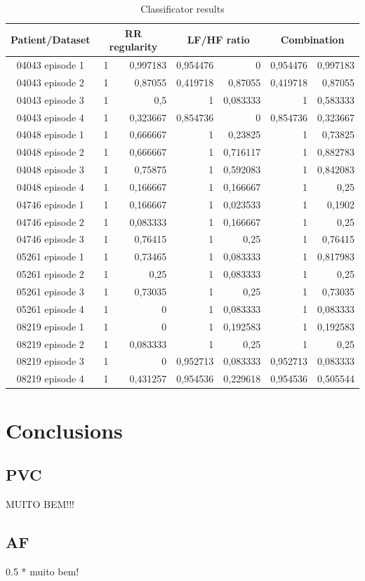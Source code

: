 \documentclass[a4paper,titlepage]{article}
\begin{document}
\begin{table}[htbp]
  \centering
  \caption{Classificator results}
    \begin{tabular}{c |rr|rr|rr|}
    \multicolumn{1}{c|}{Patient/Dataset} & \multicolumn{2}{c|}{RR regularity} & \multicolumn{2}{c|}{LF/HF ratio} & \multicolumn{2}{c|}{Combination} \\ \hline
    04043 episode 1 & 1     & 0,997183 & 0,954476 & 0     & 0,954476 & 0,997183 \\
    04043 episode 2 & 1     & 0,87055 & 0,419718 & 0,87055 & 0,419718 & 0,87055 \\
    04043 episode 3 & 1     & 0,5   & 1     & 0,083333 & 1     & 0,583333 \\
    04043 episode 4 & 1     & 0,323667 & 0,854736 & 0     & 0,854736 & 0,323667 \\
    04048 episode 1 & 1     & 0,666667 & 1     & 0,23825 & 1     & 0,73825 \\
    04048 episode 2 & 1     & 0,666667 & 1     & 0,716117 & 1     & 0,882783 \\
    04048 episode 3 & 1     & 0,75875 & 1     & 0,592083 & 1     & 0,842083 \\
    04048 episode 4 & 1     & 0,166667 & 1     & 0,166667 & 1     & 0,25 \\
    04746 episode 1 & 1     & 0,166667 & 1     & 0,023533 & 1     & 0,1902 \\
    04746 episode 2 & 1     & 0,083333 & 1     & 0,166667 & 1     & 0,25 \\
    04746 episode 3 & 1     & 0,76415 & 1     & 0,25  & 1     & 0,76415 \\
    05261 episode 1 & 1     & 0,73465 & 1     & 0,083333 & 1     & 0,817983 \\
    05261 episode 2 & 1     & 0,25  & 1     & 0,083333 & 1     & 0,25 \\
    05261 episode 3 & 1     & 0,73035 & 1     & 0,25  & 1     & 0,73035 \\
    05261 episode 4 & 1     & 0     & 1     & 0,083333 & 1     & 0,083333 \\
    08219 episode 1 & 1     & 0     & 1     & 0,192583 & 1     & 0,192583 \\
    08219 episode 2 & 1     & 0,083333 & 1     & 0,25  & 1     & 0,25 \\
    08219 episode 3 & 1     & 0     & 0,952713 & 0,083333 & 0,952713 & 0,083333 \\
    08219 episode 4 & 1     & 0,431257 & 0,954536 & 0,229618 & 0,954536 & 0,505544 \\

    \end{tabular}%
  \label{tab:addlabel}%
\end{table}%

\clearpage

\section{Conclusions}

\subsection{PVC}
MUITO BEM!!!

\subsection{AF}
0.5 * muito bem!
\end{document}
